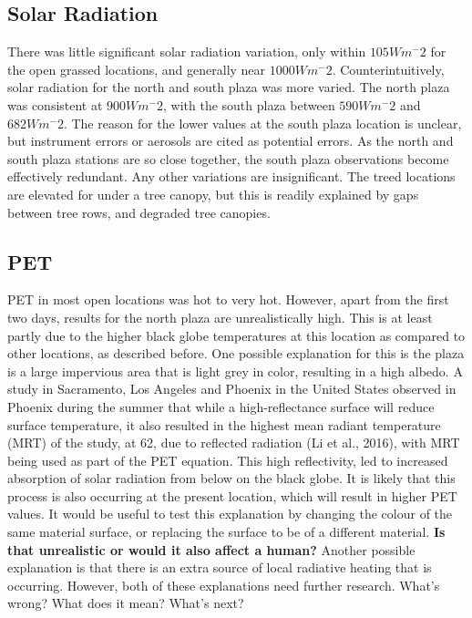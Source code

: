 \documentclass[twocolumn, a4paper]{article}
\providecommand{\comment}[1]{{\large\bf #1}}
\begin{document}
\subsection{Solar Radiation}
There was little significant solar radiation variation, only within $105Wm^-2$ for the open grassed locations, and generally near $1000Wm^-2$. Counterintuitively, solar radiation for the north and south plaza was more varied. The north plaza was consistent at $900Wm^-2$, with the south plaza between $590Wm^-2$ and $682Wm^-2$. The reason for the lower values at the south plaza location is unclear, but instrument errors \cite{ROSS2000103} or aerosols \cite{doi:10.1029/97JD01841} are cited as potential errors. As the north and south plaza stations are so close together, the south plaza observations become effectively redundant. Any other variations are insignificant. The treed locations are elevated for under a tree canopy, but this is readily explained by gaps between tree rows, and degraded tree canopies.





\subsection{PET}
PET in most open locations was hot to very hot. However, apart from the first two days, results for the north plaza are unrealistically high. This is at least partly due to the higher black globe temperatures at this location as compared to other locations, as described before. 
One possible explanation for this is the plaza is a large impervious area that is light grey in color, resulting in a high albedo. A study in Sacramento, Los Angeles and Phoenix in the United States observed in Phoenix during the summer that while a high-reflectance surface will reduce surface temperature, it also resulted in the highest mean radiant temperature (MRT) of the study, at 62\celsius, due to reflected radiation (Li et al., 2016), with MRT being used as part of the PET equation. This high reflectivity, led to increased absorption of solar radiation from below on the black globe.
It is likely that this process is also occurring at the present location, which will result in higher PET values. It would be useful to test this explanation by changing the colour of the same material surface, or replacing the surface to be of a different material.
\comment{Is that unrealistic or would it also affect a human?} Another possible explanation is that there is an extra source of local radiative heating that is occurring. However, both of these explanations need further research.
What's wrong?
What does it mean?
What's next?
\end{document}
